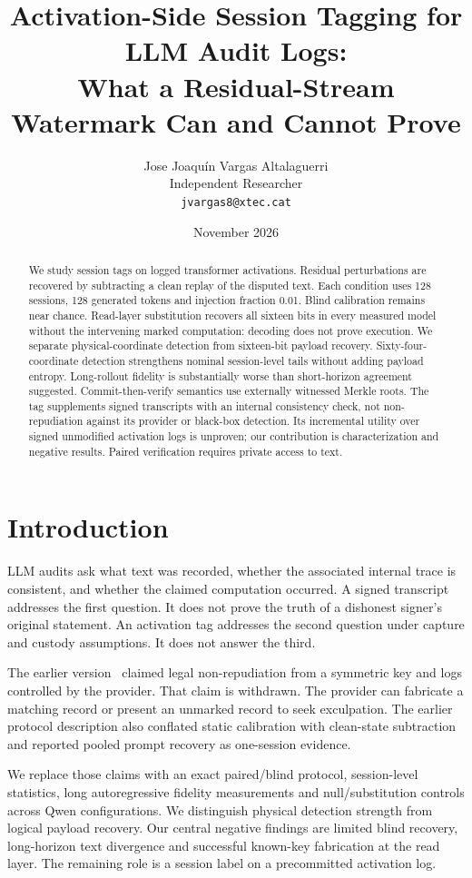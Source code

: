 \documentclass[11pt]{article}
\title{Activation-Side Session Tagging for LLM Audit Logs:\\What a Residual-Stream Watermark Can and Cannot Prove}
\author{Jose Joaqu\'in Vargas Altalaguerri\\Independent Researcher\\\texttt{jvargas8@xtec.cat}}
\date{November 2026}
\begin{document}
\maketitle
\begin{abstract}
We study session tags on logged transformer activations. Residual perturbations
are recovered by subtracting a clean replay of the disputed text. Each condition
uses 128 sessions, 128 generated tokens and injection fraction 0.01.
\PrecisionAbstract{}
Blind calibration remains near chance. Read-layer substitution recovers all
sixteen bits in every measured model without the intervening marked computation:
decoding does not prove execution. We separate physical-coordinate detection from
sixteen-bit payload recovery. Sixty-four-coordinate detection strengthens nominal
session-level tails without adding payload entropy. Long-rollout fidelity is
substantially worse than short-horizon agreement suggested. Commit-then-verify
semantics use externally witnessed Merkle roots. The tag supplements signed
transcripts with an internal consistency check, not non-repudiation against its
provider or black-box detection. Its incremental utility over signed unmodified
activation logs is unproven; our contribution is characterization and negative
results. Paired verification requires private access to text.
\end{abstract}

\section{Introduction}
LLM audits ask what text was recorded, whether the associated internal trace is
consistent, and whether the claimed computation occurred. A signed transcript
addresses the first question. It does not prove the truth of a dishonest signer's
original statement. An activation tag addresses the second question under capture
and custody assumptions. It does not answer the third.

The earlier version~\citep{vargasv1} claimed legal non-repudiation from a symmetric
key and logs controlled by the provider. That claim is withdrawn. The provider
can fabricate a matching record or present an unmarked record to seek exculpation.
The earlier protocol description also conflated static calibration with clean-state
subtraction and reported pooled prompt recovery as one-session evidence.

We replace those claims with an exact paired/blind protocol, session-level
statistics, long autoregressive fidelity measurements and null/substitution
controls across Qwen configurations. We distinguish physical detection strength
from logical payload recovery. Our central negative findings are limited blind
recovery, long-horizon text divergence and successful known-key fabrication at the
read layer. The remaining role is a session label on a precommitted activation log.
\end{document}
